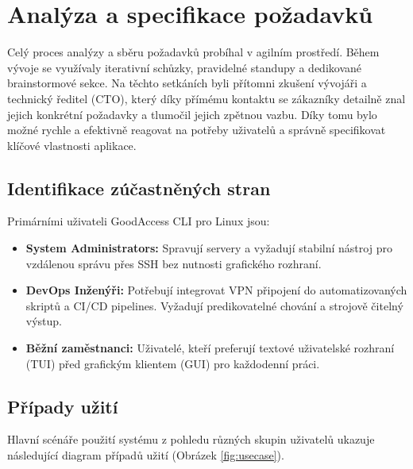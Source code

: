 \chapter{Analýza a specifikace požadavků}
\label{chap:analyza}

Celý proces analýzy a sběru požadavků probíhal v agilním prostředí. Během vývoje se využívaly iterativní schůzky, pravidelné standupy a dedikované brainstormové sekce. Na těchto setkáních byli přítomni zkušení vývojáři a technický ředitel (CTO), který díky přímému kontaktu se zákazníky detailně znal jejich konkrétní požadavky a tlumočil jejich zpětnou vazbu. Díky tomu bylo možné rychle a efektivně reagovat na potřeby uživatelů a správně specifikovat klíčové vlastnosti aplikace.

\section{Identifikace zúčastněných stran}
Primárními uživateli GoodAccess CLI pro Linux jsou:
\begin{itemize}
    \item \textbf{System Administrators:} Spravují servery a vyžadují stabilní nástroj pro vzdálenou správu přes SSH bez nutnosti grafického rozhraní.
    \item \textbf{DevOps Inženýři:} Potřebují integrovat VPN připojení do automatizovaných skriptů a CI/CD pipelines. Vyžadují predikovatelné chování a strojově čitelný výstup.
    \item \textbf{Běžní zaměstnanci:} Uživatelé, kteří preferují textové uživatelské rozhraní (TUI) před grafickým klientem (GUI) pro každodenní práci.
\end{itemize}

\section{Případy užití}
Hlavní scénáře použití systému z pohledu různých skupin uživatelů ukazuje následující diagram případů užití (Obrázek \ref{fig:usecase}).

